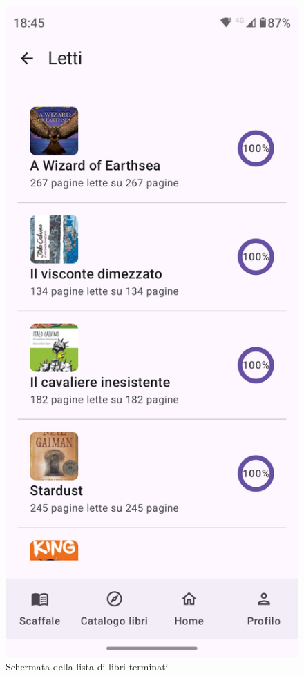 \documentclass{article}
\begin{document}
\begin{figure}[H]
  \centering
  \includegraphics[width=0.6\linewidth]{read-shelf.png}
  \caption{Schermata della lista di libri terminati}
  \label{fig:sitemap}
\end{figure}
\end{document}
